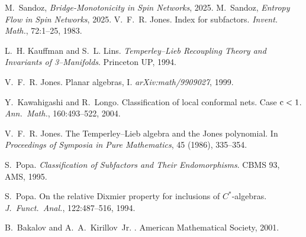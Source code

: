 \documentclass[11pt]{article}
\begin{document}

\begin{thebibliography}{9}
 M.~Sandoz, \emph{Bridge-Monotonicity in Spin Networks}, 2025.
 M.~Sandoz, \emph{Entropy Flow in Spin Networks}, 2025.
V.~F.~R. Jones.
\newblock Index for subfactors.
\newblock \emph{Invent. Math.}, 72:1–25, 1983.

L.~H. Kauffman and S.~L. Lins.
\newblock \emph{Temperley–Lieb Recoupling Theory and Invariants of 3–Manifolds}.
\newblock Princeton UP, 1994.

V.~F.~R. Jones.
\newblock Planar algebras, I.
\newblock \emph{arXiv:math/9909027}, 1999.

Y.~Kawahigashi and R.~Longo.
\newblock Classification of local conformal nets.  Case ${\rm c}<1$.
\newblock \emph{Ann.\ Math.}, 160:493–522, 2004.

V.~F.~R. Jones.
\newblock The Temperley–Lieb algebra and the Jones polynomial.
\newblock In \emph{Proceedings of Symposia in Pure Mathematics}, 45 (1986), 335–354.

S.~Popa.
\newblock \emph{Classification of Subfactors and Their Endomorphisms}.
\newblock CBMS 93, AMS, 1995.

S.~Popa.
\newblock On the relative Dixmier property for inclusions of $C^{\ast}$‐algebras.
\newblock \emph{J.\ Funct.\ Anal.}, 122:487–516, 1994.

  B.~Bakalov and A.~A.~Kirillov~Jr.
  .
  \newblock American Mathematical Society, 2001.

\end{thebibliography}
\end{document}
